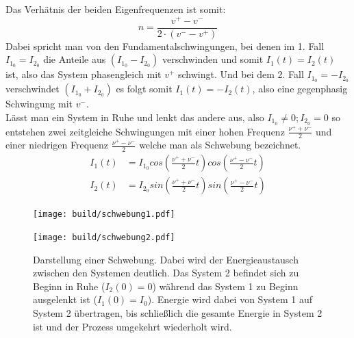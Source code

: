 Das Verhätnis der beiden Eigenfrequenzen ist somit:
\begin{equation}
    n = \frac{v^+-v^-}{2\cdot(v^--v^+)}
    \label{eqn:Verhältnis}
\end{equation}
Dabei spricht man von den Fundamentalschwingungen, bei denen im 1. Fall $I_{1_0}=I_{2_0}$ die Anteile aus
$(I_{1_0}-I_{2_0})$ verschwinden und somit $I_1(t)=I_2(t)$ ist, also das System phasengleich mit $v^+$ schwingt. 
Und bei dem 2. Fall $I_{1_0}=-I_{2_0}$ verschwindet $(I_{1_0}+I_{2_0})$ es 
folgt somit $I_1(t)=-I_2(t)$, also eine gegenphasig Schwingung mit $v^-$.\\
Lässt man ein System in Ruhe und lenkt das andere aus, also $I_{1_0}\neq 0; I_{2_0}=0$
so entstehen zwei zeitgleiche Schwingungen mit einer hohen Frequenz $\frac{\nu^+ + \nu^-}{2}$
und einer niedrigen Frequenz $\frac{\nu^+ - \nu^-}{2}$ welche man als Schwebung bezeichnet.
\begin{align}
    I_1\left(t\right)&=I_{1_0}cos\left(\frac{\nu^+ + \nu^-}{2}t\right)cos\left(\frac{\nu^+ - \nu^-}{2}t\right)\\ 
    I_2\left(t\right)&=I_{2_0}sin\left(\frac{\nu^+ + \nu^-}{2}t\right)sin\left(\frac{\nu^+ - \nu^-}{2}t\right)
\end{align}
\begin{figure}[H]
    \centering 
    \texttt{[image: build/schwebung1.pdf]}
\end{figure}
\begin{figure}[H]
    \centering
    \texttt{[image: build/schwebung2.pdf]}
    \caption{
        Darstellung einer Schwebung. Dabei wird der Energieaustausch zwischen den Systemen deutlich.
        Das System 2 befindet sich zu Beginn in Ruhe ($I_2(0)=0$) während das System 1 zu Beginn ausgelenkt ist
        ($I_1(0)=I_0$). Energie wird dabei von System 1 auf System 2 übertragen, bis schließlich die gesamte 
        Energie in System 2 ist und der Prozess umgekehrt wiederholt wird.
    }
\end{figure}


\newpage


